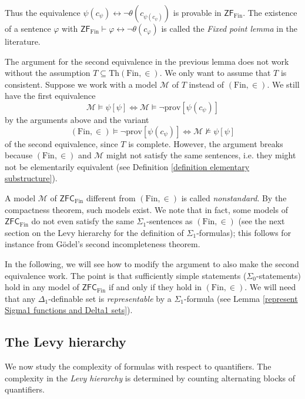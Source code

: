 \documentclass[a4paper, 11pt]{amsart}
\theoremstyle{remark}
\newcommand{\axiomft}[1]{\mathsf{#1}}
\newcommand{\ZFC}{\axiomft{ZFC}}
\newcommand{\ZF}{\axiomft{ZF}}
\newcommand{\Th}{\mathrm{Th}}
\newcommand{\Fin}{\mathrm{Fin}}
\newcommand{\prov}{\mathrm{prov}}
\newcommand{\cM}{\mathcal M}
\begin{document}
Thus the equivalence $\psi(c_\psi) \longleftrightarrow \neg \theta(c_{\psi(c_\psi)})$ is provable in $\ZF_{\Fin}$. 
The existence of a sentence $\varphi$ with $\ZF_{\Fin} \vdash \varphi \longleftrightarrow \neg \theta(c_\varphi)$ is called the \emph{Fixed point lemma} in the literature. 


The argument for the second equivalence in the previous lemma does not work without the assumption $T\subseteq \Th(\Fin,\in)$. 
We only want to assume that $T$ is consistent. 
Suppose we work with a model $\cM$ of $T$ instead of $(\Fin,\in)$. 
We still have the first equivalence 
$$ \cM \models \psi [\psi] \Longleftrightarrow \cM \models \neg \prov [\psi(c_\psi)]$$ 
by the arguments above and the variant 
$$ (\Fin,\in) \models \neg \prov[\psi(c_\psi)] \Longleftrightarrow  \cM \not\models \psi [\psi]$$ 
of the second equivalence, since $T$ is complete. 
However, the argument breaks because $(\Fin,\in)$ and $\cM$ might not satisfy the same sentences, i.e. they might not be elementarily equivalent (see Definition \ref{definition elementary substructure}). 


 

A model $\cM$ of $\ZFC_\Fin$ different from $(\Fin,\in)$ is called \emph{nonstandard}.  
By the compactness theorem, such models exist. 
We note that in fact, some models of $\ZFC_\Fin$ do not even satisfy the same $\Sigma_1$-sentences as $(\Fin,\in)$ (see the next section on the Levy hierarchy for the definition of $\Sigma_1$-formulas); this follows for instance from G\"odel's second incompleteness theorem. 

In the following, we will see how to modify the argument to also make the second equivalence work. 
The point is that sufficiently simple statements ($\Sigma_0$-statements) hold in any model of $\ZFC_\Fin$ if and only if they hold in $(\Fin,\in)$. 
We will need that any $\Delta_1$-definable set is \emph{representable} by a $\Sigma_1$-formula (see Lemma \ref{represent Sigma1 functions and Delta1 sets}). 




\subsection{The Levy hierarchy} 


We now study the complexity of formulas with respect to quantifiers. 
The complexity in the \emph{Levy hierarchy} is determined by counting alternating blocks of quantifiers. 
\end{document}
